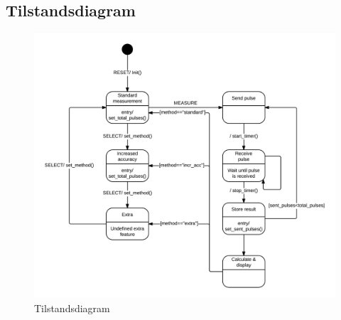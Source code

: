 \documentclass[a4paper,11pt]{article}
\theoremstyle{mytheor}
\begin{document}
\subsection{Tilstandsdiagram}

\begin{figure}[!htb]
\centering
\includegraphics[width=\textwidth]{project_state_chart.png}
\caption{\label{fig:statech}Tilstandsdiagram}
\end{figure}
\end{document}
